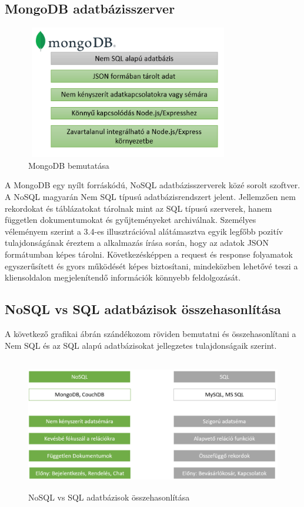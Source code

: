 \subsection{MongoDB adatbázisszerver}

\begin{figure}[H]
	\centering
	\includegraphics[width=0.8\textwidth,height=220px]{images/mongodb_bemutatasa.png}
	\caption{MongoDB bemutatása}
	\label{fig.picture-5}
\end{figure}

A MongoDB egy nyílt forráskódú, NoSQL adatbázisszerverek közé sorolt szoftver. A NoSQL magyarán Nem SQL típusú adatbázisrendszert jelent. Jellemzően nem rekordokat és táblázatokat tárolnak mint az SQL típusú szerverek, hanem független dokumentumokat és gyűjteményeket archiválnak. Személyes véleményem szerint a 3.4-es illusztrációval alátámasztva egyik legfőbb pozitív tulajdonságának éreztem a alkalmazás írása során, hogy az adatok JSON formátumban képes tárolni. Következésképpen a request és response folyamatok egyszerűsített és gyors működését képes biztosítani, mindeközben lehetővé teszi a kliensoldalon megjelenítendő információk könnyebb feldolgozását. 
\bigskip

\subsection{NoSQL vs SQL adatbázisok összehasonlítása}

A következő grafikai ábrán szándékozom röviden bemutatni és összehasonlítani a Nem SQL és az SQL alapú adatbázisokat jellegzetes tulajdonságaik szerint.

\begin{figure}[H]
	\centering
	\includegraphics[width=1.0\textwidth,height=220px]{images/nosql_bemutatasa.png}
	\caption{NoSQL vs SQL adatbázisok összehasonlítása}
	\label{fig.picture-6}
\end{figure}

